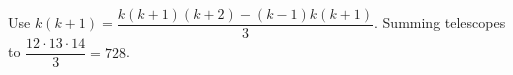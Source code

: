 Use $k(k+1)=\dfrac{k(k+1)(k+2)-(k-1)k(k+1)}{3}$. Summing telescopes to $\dfrac{12\cdot13\cdot14}{3}=\boxed{728}$.
